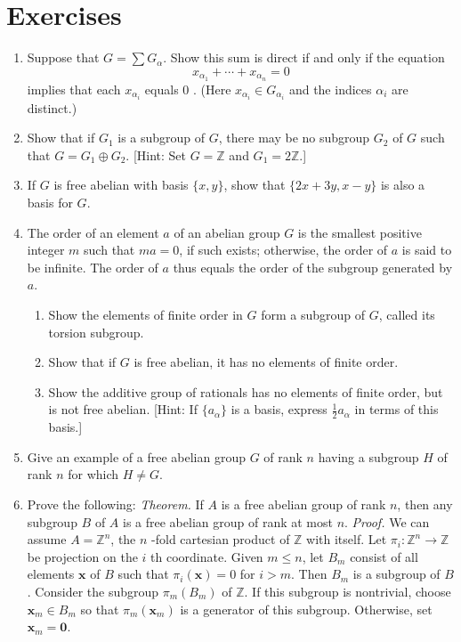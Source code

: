 \section*{Exercises}
\begin{enumerate}[itemsep=0.4em, parsep=0pt, topsep=0pt, partopsep=0pt, leftmargin=*, label=\arabic*., ref=\arabic*]
\item Suppose that \(G = \sum {G}_{\alpha }\). Show this sum is direct if and only if the equation \[ x_{{\alpha }_{1}} + \cdots + x_{{\alpha }_{n}} = 0 \] implies that each \(x_{{\alpha }_{i}}\) equals 0 . (Here \(x_{{\alpha }_{i}} \in {G}_{{\alpha }_{i}}\) and the indices \({\alpha }_{i}\) are distinct.)
\item Show that if \(G_{1}\) is a subgroup of \(G\), there may be no subgroup \(G_{2}\) of \(G\) such that \(G = G_{1} \oplus {G}_{2}\). [Hint: Set \(G = \mathbb{Z}\) and \(G_{1} = 2\mathbb{Z}\).]
\item If \(G\) is free abelian with basis \(\{ x,y\}\), show that \(\{ {2x} + {3y},x - y\}\) is also a basis for \(G\).
\item The order of an element \(a\) of an abelian group \(G\) is the smallest positive integer \(m\) such that \({ma} = 0\), if such exists; otherwise, the order of \(a\) is said to be infinite. The order of \(a\) thus equals the order of the subgroup generated by \(a\).
 \begin{enumerate}[itemsep=0.2em, parsep=0pt, topsep=0pt, partopsep=0pt, leftmargin=*, label=(\alph*), align=left]
 \item Show the elements of finite order in \(G\) form a subgroup of \(G\), called its torsion subgroup.
 \item Show that if \(G\) is free abelian, it has no elements of finite order.
 \item Show the additive group of rationals has no elements of finite order, but is not free abelian. [Hint: If \(\{ a_{\alpha }\}\) is a basis, express \(\frac{1}{2}a_{\alpha }\) in terms of this basis.]
 \end{enumerate}
\item Give an example of a free abelian group \(G\) of rank \(n\) having a subgroup \(H\) of rank \(n\) for which \(H \neq G\).
\item Prove the following: \textsl{Theorem.} If \(A\) is a free abelian group of rank \(n\), then any subgroup \(B\) of \(A\) is a free abelian group of rank at most \(n\). \textsl{Proof.} We can assume \(A = \mathbb{Z}^{n}\), the \(n\) -fold cartesian product of \(\mathbb{Z}\) with itself. Let \({\pi }_{i} : \mathbb{Z}^{n} \rightarrow \mathbb{Z}\) be projection on the \(i\) th coordinate. Given \(m \leq n\), let \(B_{m}\) consist of all elements \(\mathbf{x}\) of \(B\) such that \({\pi }_{i}( \mathbf{x}) = 0\) for \(i > m\). Then \(B_{m}\) is a subgroup of \(B\). Consider the subgroup \({\pi }_{m}( B_{m})\) of \(\mathbb{Z}\). If this subgroup is nontrivial, choose \(\mathbf{x}_{m} \in {B}_{m}\) so that \({\pi }_{m}( \mathbf{x}_{m})\) is a generator of this subgroup. Otherwise, set \(\mathbf{x}_{m} = \mathbf{0}\).

\end{enumerate}
